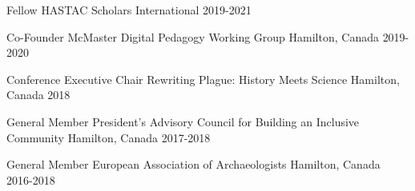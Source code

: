 


\begin{cvhonors} 


    \cvhonor
        {Fellow} %
        {HASTAC Scholars} %
        {International} %
        {2019-2021} %

    \cvhonor
        {Co-Founder} %
        {McMaster Digital Pedagogy Working Group} %
        {Hamilton, Canada} %
        {2019-2020} %

    \cvhonor
        {Conference Executive Chair} %
        {Rewriting Plague: History Meets Science} %
        {Hamilton, Canada} %
        {2018} %

    \cvhonor
        {General Member} %
        {President’s Advisory Council for Building an Inclusive Community} %
        {Hamilton, Canada} %
        {2017-2018} %

    \cvhonor
        {General Member} %
        {European Association of Archaeologists} %
        {Hamilton, Canada} %
        {2016-2018} %

\end{cvhonors}    

